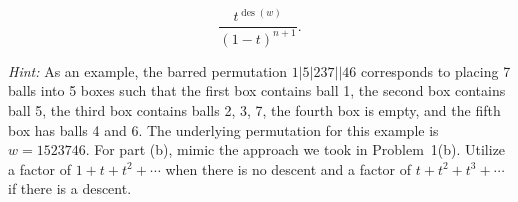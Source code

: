 \documentclass[11pt]{article}%
\theoremstyle{definition}
\DeclareMathOperator{\des}{des}
\begin{document}
\begin{enumerate}
\begin{enumerate}
\[
\frac{t^{\des(w)}}{(1-t)^{n+1}}.
\]
\end{enumerate}
\emph{Hint:} As an example, the barred permutation  $1|5|237||46$ corresponds to placing 7 balls into 5 boxes such that the first box contains ball 1, the second box contains ball 5, the third box contains balls 2, 3, 7, the fourth box is empty, and the fifth box has balls 4 and 6. The underlying permutation for this example is $w=1523746$. For part (b), mimic the approach we took in Problem~1(b).  Utilize a factor of $1+t+t^2+\cdots$ when there is no descent and a factor of $t+t^2+t^3+\cdots$ if there is a descent.
\end{enumerate}
\end{document}
